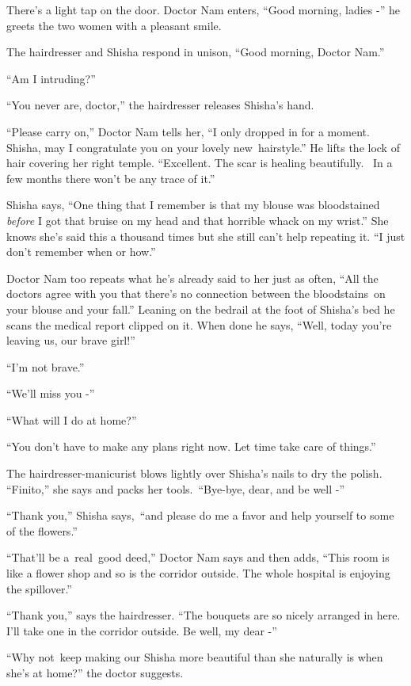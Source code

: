 \documentclass[twoside,11pt]{book}
\begin{document}
There's a light tap on the door. Doctor Nam enters, ``Good morning, ladies -'' he greets the
two women with a pleasant smile.

The hairdresser and Shisha respond in unison, ``Good morning, Doctor Nam.'' 

``Am I intruding?'' 

``You never are, doctor,'' the hairdresser releases Shisha's hand. 

``Please carry on,'' Doctor Nam tells her, ``I only dropped in for a moment.
Shisha, may I congratulate you on your lovely new~hairstyle.'' He lifts the lock of hair covering her
right temple. ``Excellent. The scar is healing beautifully. ~In a few months there won't be any trace of
it.'' 

Shisha says, ``One thing that I remember is that my blouse was bloodstained \textit{before} I got that
bruise on my head and that horrible whack on my wrist.'' She knows she's said this a thousand times but
she still can't help repeating it. ``I just don't remember when or how.'' 

Doctor Nam too repeats what he's already said to her just as often, ``All the doctors agree with you that
there's no connection between the bloodstains~on your blouse and your fall.'' Leaning on the bedrail at
the foot of Shisha's bed he scans the medical report clipped on it. When done he says, ``Well, today
you're leaving us, our brave girl!'' 

``I'm not brave.'' 

``We'll miss you -'' 

``What will I do at home?'' 

``You don't have to make any plans right now. Let time take care of things.'' 

The hairdresser-manicurist blows lightly over Shisha's nails to dry the polish. ``Finito,''
she says and packs her tools.~``Bye-bye, dear, and be well -'' ~

``Thank you,'' Shisha says,~``and please do me a favor and help yourself to some
of the flowers.'' 

``That'll be a\ real\ good deed,'' Doctor Nam says and then adds, ``This room is
like a flower shop and so is the corridor outside. The whole hospital is enjoying the spillover.''

``Thank you,'' says the hairdresser. ``The bouquets are so nicely arranged in
here. I'll take one in the corridor outside. Be well, my dear -'' 

``Why not~keep making our Shisha more beautiful than she naturally is when she's at home?''
the doctor suggests. 
\end{document}
